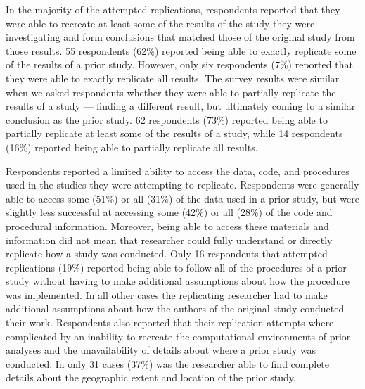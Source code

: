 \documentclass[]{interact}
\theoremstyle{plain}%
\theoremstyle{definition}
\theoremstyle{remark}
\begin{document}
In the majority of the attempted replications, respondents reported that they were able to recreate at least some of the results of the study they were investigating and form conclusions that matched those of the original study from those results. 
55 respondents (62\%) reported being able to exactly replicate some of the results of a prior study. 
However, only six respondents (7\%) reported that they were able to exactly replicate all results.
The survey results were similar when we asked respondents whether they were able to partially replicate the results of a study --- finding a different result, but ultimately coming to a similar conclusion as the prior study. 
62 respondents (73\%) reported being able to partially replicate at least some of the results of a study, while 14 respondents (16\%) reported being able to partially replicate all results. 

Respondents reported a limited ability to access the data, code, and procedures used in the studies they were attempting to replicate. 
Respondents were generally able to access some (51\%) or all (31\%) of the data used in a prior study, but were slightly less successful at accessing some (42\%) or all (28\%) of the code and procedural information.
Moreover, being able to access these materials and information did not mean that researcher could fully understand or directly replicate how a study was conducted.
Only 16 respondents that attempted replications (19\%) reported being able to follow all of the procedures of a prior study without having to make additional assumptions about how the procedure was implemented. 
In all other cases the replicating researcher had to make additional assumptions about how the authors of the original study conducted their work.
Respondents also reported that their replication attempts where complicated by an inability to recreate the computational environments of prior analyses and the unavailability of details about where a prior study was conducted.
In only 31 cases (37\%) was the researcher able to find complete details about the geographic extent and location of the prior study.
\end{document}
